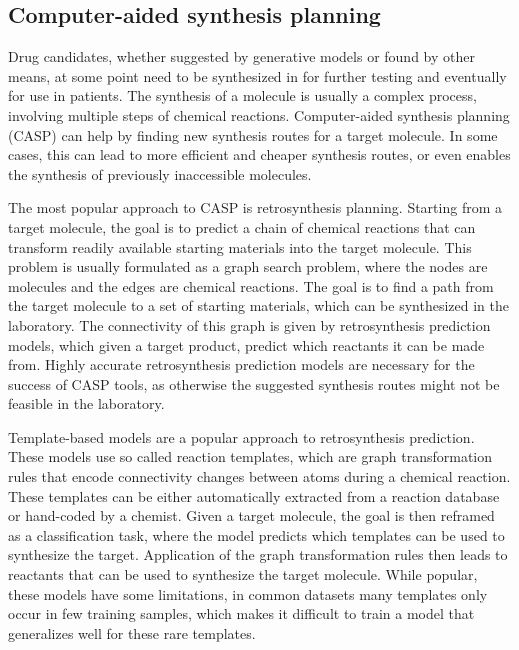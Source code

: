 \subsection{Computer-aided synthesis planning}
Drug candidates, whether suggested by generative models or found by other means, at some point need
to be synthesized in for further testing and eventually for use in patients. The synthesis of a
molecule is usually a complex process, involving multiple steps of chemical reactions.
Computer-aided synthesis planning (CASP) can help by finding new synthesis routes for a target
molecule. In some cases, this can lead to more efficient and cheaper synthesis routes, or even
enables the synthesis of previously inaccessible molecules.

The most popular approach to CASP is retrosynthesis planning. Starting from a target molecule, the
goal is to predict a chain of chemical reactions that can transform readily available starting
materials into the target molecule. This problem is usually formulated as a graph search problem,
where the nodes are molecules and the edges are chemical reactions. The goal is to find a path from
the target molecule to a set of starting materials, which can be synthesized in the laboratory. The
connectivity of this graph is given by retrosynthesis prediction models, which given a target
product, predict which reactants it can be made from. Highly accurate retrosynthesis prediction
models are necessary for the success of CASP tools, as otherwise the suggested synthesis routes
might not be feasible in the laboratory.

Template-based models are a popular approach to retrosynthesis prediction. These models use so
called reaction templates, which are graph transformation rules that encode connectivity changes
between atoms during a chemical reaction. These templates can be either automatically extracted from
a reaction database or hand-coded by a chemist. Given a target molecule, the goal is then reframed
as a classification task, where the model predicts which templates can be used to synthesize the
target. Application of the graph transformation rules then leads to reactants that can be used to
synthesize the target molecule. While popular, these models have some limitations, in common
datasets many templates only occur in few training samples, which makes it difficult to train a
model that generalizes well for these rare templates.

